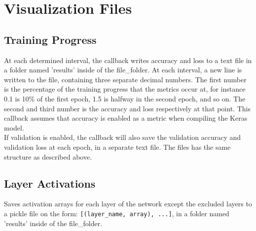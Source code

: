 \chapter{Visualization Files}

\section{Training Progress}

At each determined interval, the callback writes accuracy and loss to a text file in a folder named 'results' inside of the file\_folder. At each interval, a new line is written to the file, containing three separate decimal numbers. The first number is the percentage of the training progress that the metrics occur at, for instance 0.1 is 10\% of the first epoch, 1.5 is halfway in the second epoch, and so on. The second and third number is the accuracy and loss respectively at that point. This callback assumes that accuracy is enabled as a metric when compiling the Keras model. \\

\noindent If validation is enabled, the callback will also save the validation accuracy and validation loss at each epoch, in a separate text file. The files has the same structure as described above.


\section{Layer Activations}

Saves activation arrays for each layer of the network except the excluded layers to a pickle file on the form: \texttt{[(layer\_name, array), ...]}, in a folder named 'results' inside of the file\_folder.


